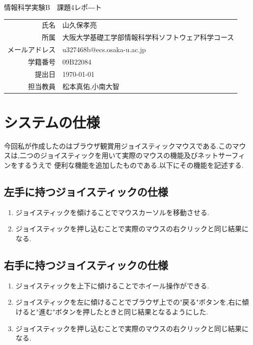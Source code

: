 \documentclass[dvipdfmx]{jarticle}
\begin{document}
\begin{titlepage}
    \begin{center}
        {\huge 情報科学実験B　課題4レポ―ト}
        \vspace{180pt}\\
        \begin{tabular}{rl}
            氏名 & 山久保孝亮\\
            所属 & 大阪大学基礎工学部情報科学科ソフトウェア科学コース\\
            メールアドレス & u327468b@ecs.osaka-u.ac.jp\\
            学籍番号 & 09B22084\\
            提出日 & \today\\
            担当教員 & 松本真佑,小南大智
        \end{tabular}
    \end{center}
\end{titlepage}

\section{システムの仕様}
今回私が作成したのはブラウザ観賞用ジョイスティックマウスである.このマウスは,二つのジョイスティックを用いて実際のマウスの機能及びネットサーフィンをするうえで
便利な機能を追加したものである.以下にその機能を記述する.
\subsection{左手に持つジョイスティックの仕様}
\begin{enumerate}
    \item ジョイスティックを傾けることでマウスカーソルを移動させる.
    \item ジョイスティックを押し込むことで実際のマウスの右クリックと同じ結果になる.
\end{enumerate}
\subsection{右手に持つジョイスティックの仕様}
\begin{enumerate}
    \item ジョイスティックを上下に傾けることでホイール操作ができる.
    \item ジョイスティックを左に傾けることでブラウザ上での"戻る"ボタンを,右に傾けると"進む"ボタンを押したときと同じ結果となるようにした.
    \item ジョイスティックを押し込むことで実際のマウスの右クリックと同じ結果になる.
\end{enumerate}
\end{document}
